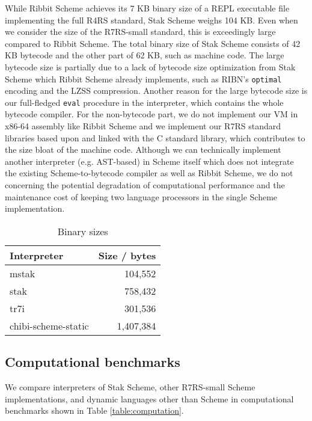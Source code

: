 \documentclass[sigplan, anonymous, review]{acmart}
\begin{document}
While Ribbit Scheme \cite{ribbit7kb2023} achieves its 7 KB binary size
of a REPL executable file implementing the full R4RS standard, Stak
Scheme weighs 104 KB.
Even when we consider the size of the R7RS-small standard, this is
exceedingly large compared to Ribbit Scheme.
The total binary size of Stak Scheme consists of 42 KB bytecode and
the other part of 62 KB, such as machine code.
The large bytecode size is partially due to a lack of
bytecode size optimization from Stak Scheme which Ribbit Scheme already
implements, such as RIBN's \texttt{optimal} encoding and the
LZSS compression.
Another reason for the large bytecode size is our full-fledged
\texttt{eval} procedure in the interpreter, which contains the
whole bytecode compiler.
For the non-bytecode part, we do not implement our VM in x86-64
assembly like Ribbit Scheme and we implement our R7RS standard libraries
based upon and linked with the C standard library,
which contributes to the size bloat of the machine code.
Although we can technically implement another interpreter
(e.g. AST-based) in Scheme itself which does not integrate the
existing Scheme-to-bytecode compiler as well as Ribbit Scheme,
we do not concerning the potential degradation of
computational performance and the maintenance cost of keeping two
language processors in the single Scheme implementation.

\begin{table}
  \begin{center}
    \caption{Binary sizes}
    \label{table:binary}
    \begin{tabular}{l|r}
      \hline
      Interpreter & Size / bytes \\
      \hline
      mstak & 104,552 \\
      stak & 758,432 \\
      tr7i & 301,536 \\
      chibi-scheme-static & 1,407,384 \\
      \hline
    \end{tabular}
  \end{center}
\end{table}

\subsection{Computational benchmarks}

We compare interpreters of Stak Scheme, other R7RS-small Scheme
implementations, and
dynamic languages other than Scheme in computational
benchmarks shown in Table \ref{table:computation}.
\end{document}
